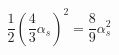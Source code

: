 \begin{equation}      
\frac{1}{2} (\frac{4}{3} \alpha_{s})^{2} = \frac{8}{9} \alpha_{s}^{2}       
\end{equation}

